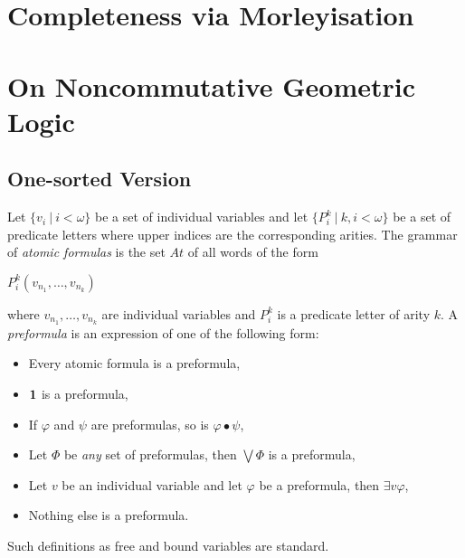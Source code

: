 \documentclass[8pt]{article}
\theoremstyle{definition}
\theoremstyle{definition}
\theoremstyle{definition}
\theoremstyle{definition}
\theoremstyle{definition}
\theoremstyle{definition}
\theoremstyle{definition}
\theoremstyle{definition}
\theoremstyle{definition}
\theoremstyle{definition}
\theoremstyle{definition}
\theoremstyle{definition}
\theoremstyle{definition}
\theoremstyle{question}
\begin{document}
\section{Completeness via Morleyisation}


\section{On Noncommutative Geometric Logic}

\subsection{One-sorted Version}


Let $\{ v_i \: | \: i < \omega \}$ be a set of individual variables and let 
$\{ P^k_i \: | \: k, i < \omega \}$ be a set of predicate letters where upper indices
are the corresponding arities.
The grammar of \emph{atomic formulas} is the set $At$ of all words of the form
\begin{center}
  $P^k_i(v_{n_1}, \ldots, v_{n_k})$
\end{center}
where $v_{n_1}, \ldots, v_{n_k}$ are individual variables and $P^{k}_i$ is a predicate letter of arity $k$.
A \emph{preformula} is an expression of one of the following form:
\begin{itemize}
\item Every atomic formula is a preformula,
\item ${\bf 1}$ is a preformula,
\item If $\varphi$ and $\psi$ are preformulas, so is $\varphi \bullet \psi$,
\item Let $\Phi$ be \emph{any} set of preformulas, then $\bigvee \Phi$ is a preformula,
\item Let $v$ be an individual variable and let $\varphi$ be a preformula, then $\exists v \varphi$,
\item Nothing else is a preformula.
\end{itemize}
Such definitions as free and bound variables are standard.
\end{document}
